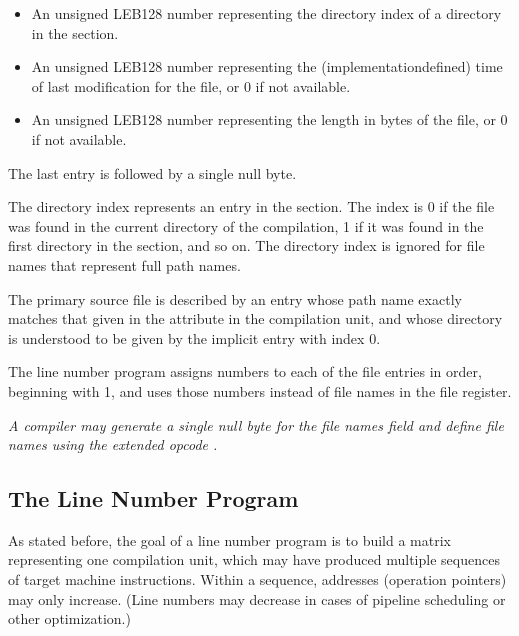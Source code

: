 \begin{enumerate}[1.]
\begin{itemize}
\item An unsigned LEB128 number representing the directory
index of a directory in the 
 section.


\item An unsigned LEB128 number representing the
(implementation\dash defined) time of last modification for
the file, or 0 if not available.

\item An unsigned LEB128 number representing the length in
bytes of the file, or 0 if not available.  

\end{itemize}

The last entry is followed by a single null byte.

The directory index represents an entry in the
 section. 
The index is 0 if the file was
found in the current directory of the compilation, 1 if it
was found in the first directory in the 
section, and so on. The directory index is ignored for file
names that represent full path names.

The primary source file is described by an entry whose path
name exactly matches that given in the  attribute
in the compilation unit, and whose directory is understood
to be given by the implicit entry with index 0.

The line number program assigns numbers to each of the file
entries in order, beginning with 1, and uses those numbers
instead of file names in the file register.

\textit{A compiler may generate a single null byte for the file
names field and define file names using the extended opcode
.}


\end{enumerate}

\subsection{The Line Number Program}

As stated before, the goal of a line number program is to build
a matrix representing one compilation unit, which may have
produced multiple sequences of target machine instructions.
Within a sequence, addresses 
(operation pointers) may only
increase. (Line numbers may decrease in cases of pipeline
scheduling or other optimization.)

